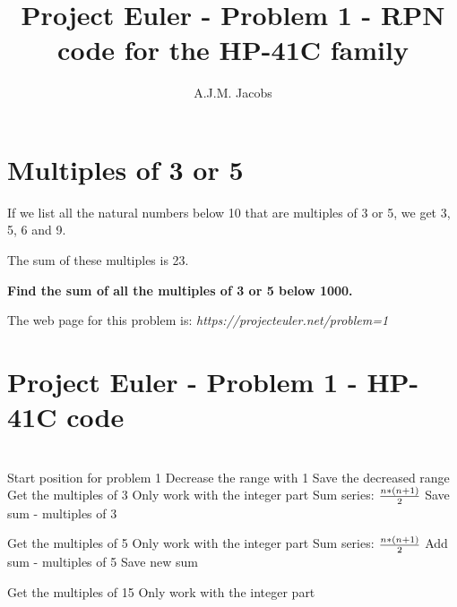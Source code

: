 \documentclass[a4paper, landscape]{article}
\author{A.J.M. Jacobs}
\title{Project Euler - Problem 1 - RPN code for the HP-41C family}
\begin{document}
\maketitle

\rm
\section{Multiples of 3 or 5}

\bigskip
\noindent
If we list all the natural numbers below 10 that are multiples of 3 or 5, we get 3, 5, 6 and 9. 

\noindent
The sum of these multiples is 23.


\bigskip
\noindent
\textbf{Find the sum of all the multiples of 3 or 5 below 1000.}


\bigskip
\bigskip
\noindent
The web page for this problem is: 
\textit{https://projecteuler.net/problem=1}


\clearpage
\section{Project Euler - Problem 1 - HP-41C code}

\tStarttabular
{}
\\
		{Start position for problem 1}  
         {Decrease the range with 1}
\tOPminusfo			{}
        {Save the decreased range}
         {Get the multiples of 3}
\tOPdividefo 		{}
     {Only work with the integer part}
\tENTERfo			{}
\tENTERfo			{}
         {Sum series: $n*(n+1) \over 2$}
\tOPplusfo			{}
\tOPmultiplyfo		{}
       {}
\tOPmultiplyfo		{}
        {Save sum - multiples of 3}

\tNewPage

 		{}
			{Get the multiples of 5}
\tOPdividefo 		{}
     {Only work with the integer part}
\tENTERfo			{}
\tENTERfo			{}
         {Sum series: $n*(n+1) \over 2$}
\tOPplusfo			{}
\tOPmultiplyfo		{}
       {}
\tOPmultiplyfo		{}
 		{Add sum - multiples of 5}
\tOPplusfo			{}
        {Save new sum}

 		{}
		{Get the multiples of 15}
\tOPdividefo 		{}
     {Only work with the integer part}
		{}
\tENTERfo			{}
\tENTERfo			{}
\end{document}
